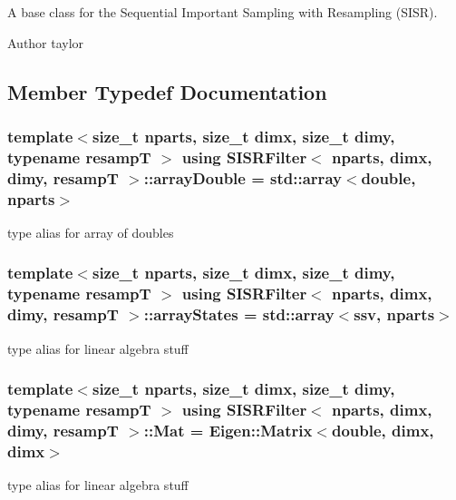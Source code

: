 A base class for the Sequential Important Sampling with Resampling (S\+I\+SR). 

\begin{DoxyAuthor}{Author}
taylor 
\end{DoxyAuthor}


\subsection{Member Typedef Documentation}
\subsubsection[{\texorpdfstring{array\+Double}{arrayDouble}}]{\setlength{\rightskip}{0pt plus 5cm}template$<$size\+\_\+t nparts, size\+\_\+t dimx, size\+\_\+t dimy, typename resampT $>$ using {\bf S\+I\+S\+R\+Filter}$<$ nparts, dimx, dimy, resampT $>$\+::{\bf array\+Double} =  std\+::array$<$double, nparts$>$}\hypertarget{classSISRFilter_a6925bb8edf01ea99ddcff65b277cb72c}{}\label{classSISRFilter_a6925bb8edf01ea99ddcff65b277cb72c}
type alias for array of doubles 
\subsubsection[{\texorpdfstring{array\+States}{arrayStates}}]{\setlength{\rightskip}{0pt plus 5cm}template$<$size\+\_\+t nparts, size\+\_\+t dimx, size\+\_\+t dimy, typename resampT $>$ using {\bf S\+I\+S\+R\+Filter}$<$ nparts, dimx, dimy, resampT $>$\+::{\bf array\+States} =  std\+::array$<${\bf ssv}, nparts$>$}\hypertarget{classSISRFilter_aea07f74ad2073e48134a1b8130a1e2cf}{}\label{classSISRFilter_aea07f74ad2073e48134a1b8130a1e2cf}
type alias for linear algebra stuff 
\subsubsection[{\texorpdfstring{Mat}{Mat}}]{\setlength{\rightskip}{0pt plus 5cm}template$<$size\+\_\+t nparts, size\+\_\+t dimx, size\+\_\+t dimy, typename resampT $>$ using {\bf S\+I\+S\+R\+Filter}$<$ nparts, dimx, dimy, resampT $>$\+::{\bf Mat} =  Eigen\+::\+Matrix$<$double, dimx, dimx$>$}\hypertarget{classSISRFilter_a6563da123e66df0b1140140a5b40d535}{}\label{classSISRFilter_a6563da123e66df0b1140140a5b40d535}
type alias for linear algebra stuff 

